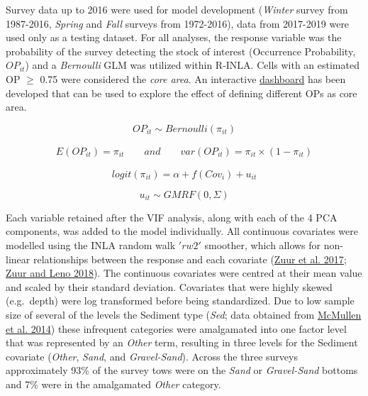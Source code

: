 \documentclass[
]{article}
\begin{document}
Survey data up to 2016 were used for model development (\emph{Winter} survey from 1987-2016, \emph{Spring} and \emph{Fall} surveys from 1972-2016), data from 2017-2019 were used only as a testing dataset. For all analyses, the response variable was the probability of the survey detecting the stock of interest (Occurrence Probability, \(OP_{it}\)) and a \emph{Bernoulli} GLM was utilized within R-INLA. Cells with an estimated OP \(\geq\) 0.75 were considered the \emph{core area}. An interactive \href{https://github.com/Dave-Keith/Paper_2_SDMs/tree/master/Dashboard}{dashboard} has been developed that can be used to explore the effect of defining different OPs as core area.

\[ OP_{it} \sim Bernoulli(\pi_{it}) \]

\begin{align}
E(OP_{it}) = \pi_{it} \qquad and \qquad var(OP_{it}) = \pi_{it} \times (1-\pi_{it})
\end{align}

\[ logit(\pi_{it}) = \alpha + f(Cov_{i}) + u_{it} \]

\[ u_{it} \sim GMRF(0,\Sigma) \]

Each variable retained after the VIF analysis, along with each of the 4 PCA components, was added to the model individually. All continuous covariates were modelled using the INLA random walk \('rw2'\) smoother, which allows for non-linear relationships between the response and each covariate (\protect\hyperlink{ref-zuurBeginnerGuideSpatial2017}{Zuur et al. 2017}; \protect\hyperlink{ref-zuurBeginnerGuideSpatial2018}{Zuur and Leno 2018}). The continuous covariates were centred at their mean value and scaled by their standard deviation. Covariates that were highly skewed (e.g.~depth) were log transformed before being standardized. Due to low sample size of several of the levels the Sediment type (\emph{Sed}; data obtained from \protect\hyperlink{ref-mcmullen2014GISData2014}{McMullen et al. 2014}) these infrequent categories were amalgamated into one factor level that was represented by an \emph{Other} term, resulting in three levels for the Sediment covariate (\emph{Other}, \emph{Sand}, and \emph{Gravel-Sand}). Across the three surveys approximately 93\% of the survey tows were on the \emph{Sand} or \emph{Gravel-Sand} bottoms and 7\% were in the amalgamated \emph{Other} category.
\end{document}
